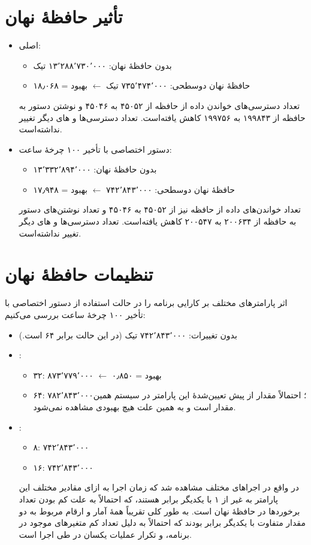\documentclass[12pt,titlepage,a4page , tikz , multi,table , svgnames,xcdraw]{article}
\begin{document}
\section{تأثیر حافظهٔ نهان}
\begin{itemize}
\item
{}
اصلی:
\begin{itemize}
\item
بدون حافظهٔ نهان: ۱۳٬۲۸۸٬۷۳۰٬۰۰۰ تیک
\item
حافظهٔ نهان دوسطحی: ۷۳۵٬۴۷۴٬۰۰۰ تیک
$\leftarrow$
بهبود = ۱۸٫۰۶۸
\end{itemize}
تعداد دسترسی‌های خواندن‌ داده از حافظه از ۴۵۰۵۲ به ۴۵۰۴۶ و نوشتن دستور به حافظه از ۱۹۹۸۴۳ به ۱۹۹۷۵۶ کاهش یافته‌است. تعداد دسترسی‌ها و
های
دیگر تغییر نداشته‌است.
\item
دستور اختصاصی با تأخیر ۱۰۰ چرخهٔ ساعت:
\begin{itemize}
\item
بدون حافظهٔ نهان: ۱۳٬۳۳۲٬۸۹۴٬۰۰۰
\item
حافظهٔ نهان دوسطحی: ۷۴۲٬۸۴۳٬۰۰۰
$\leftarrow$
بهبود = ۱۷٫۹۴۸
\end{itemize}
تعداد خواندن‌های داده از حافظه نیز از ۴۵۰۵۲ به ۴۵۰۴۶ و تعداد نوشتن‌های دستور به حافظه از ۲۰۰۶۳۴ به ۲۰۰۵۴۷ کاهش یافته‌است. تعداد دسترسی‌ها و
های
دیگر تغییر نداشته‌است.
\end{itemize}
\newpage
\section{تنظیمات حافظهٔ نهان}
اثر پارامترهای مختلف بر کارایی برنامه را در حالت استفاده از دستور اختصاصی با تأخیر ۱۰۰ چرخهٔ ساعت بررسی می‌کنیم:
\begin{itemize}
\item
بدون تغییرات: ۷۴۲٬۸۴۳٬۰۰۰ تیک (در این حالت
برابر ۶۴ است.)
\item
{}:
\begin{itemize}
\item
۳۲: ۸۷۳٬۷۷۹٬۰۰۰
$\leftarrow$
بهبود = ۰٫۸۵۰
\item
۶۴: ۷۸۲٬۸۴۳٬۰۰۰؛
احتمالاً مقدار از پیش تعیین‌شدهٔ این پارامتر در سیستم همین مقدار است و به همین علت هیچ بهبودی مشاهده نمی‌شود.
\end{itemize}
\item
{}:
\begin{itemize}
\item
۸: ۷۴۲٬۸۴۳٬۰۰۰
\item
۱۶: ۷۴۲٬۸۴۳٬۰۰۰
\end{itemize}
در واقع در اجراهای مختلف مشاهده شد که زمان اجرا به ازای مقادیر مختلف این پارامتر به غیر از ۱ با یکدیگر برابر هستند، که احتمالاً به علت کم بودن تعداد برخوردها در حافظهٔ نهان است. به طور کلی تقریباً همهٔ آمار و ارقام مربوط به دو مقدار متفاوت
با یکدیگر برابر بودند که احتمالاً به دلیل تعداد کم متغیرهای موجود در برنامه، و تکرار عملیات یکسان در طی اجرا است.
\end{itemize}
\end{document}
